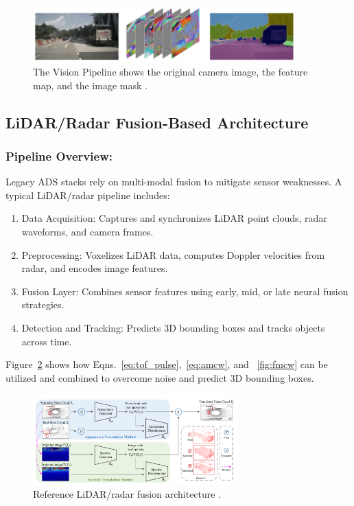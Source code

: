 \documentclass[12pt]{article}
\begin{document}
\begin{figure}[H]
	\centering
	\includegraphics[width=0.9\textwidth]{masking}
	\caption{The Vision Pipeline shows the original camera image, the feature map,
	and the image mask \cite{wang2024}.}
	\label{fig:visionpipe}
\end{figure}

\subsection{LiDAR/Radar Fusion-Based Architecture}

\subsubsection{Pipeline Overview:}

Legacy ADS stacks rely on multi-modal fusion to mitigate sensor weaknesses. A typical LiDAR/radar pipeline includes:

\begin{enumerate}[label=\alph*), nosep]
  \item Data Acquisition: Captures and synchronizes LiDAR point clouds, radar waveforms, and camera frames.
  \item Preprocessing: Voxelizes LiDAR data, computes Doppler velocities from radar, and encodes image features.
  \item Fusion Layer: Combines sensor features using early, mid, or late neural fusion strategies.
  \item Detection and Tracking: Predicts 3D bounding boxes and tracks objects across time.
\end{enumerate}
Figure~\ref{fig:lidarstack} shows how
Eqns.~\ref{eq:tof_pulse},~\ref{eq:amcw}, and ~\ref{fig:fmcw} can be utilized and
combined to overcome noise and predict 3D bounding boxes.

\begin{figure}[H]
	\centering
	\includegraphics[width=0.7\textwidth]{lidararchitecture}
	\caption{Reference LiDAR/radar fusion architecture \autocite{Haghighi2024}.}
	\label{fig:lidarstack}
\end{figure}
\end{document}
